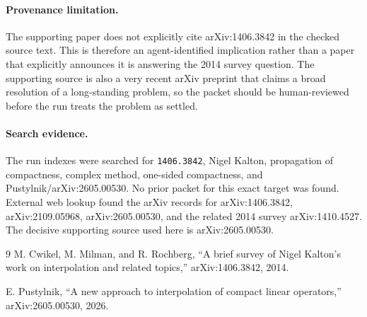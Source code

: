 \documentclass[11pt]{article}
\begin{document}
\paragraph{Provenance limitation.}
The supporting paper does not explicitly cite arXiv:1406.3842 in the checked
source text. This is therefore an agent-identified implication rather than a
paper that explicitly announces it is answering the 2014 survey question. The
supporting source is also a very recent arXiv preprint that claims a broad
resolution of a long-standing problem, so the packet should be human-reviewed
before the run treats the problem as settled.

\paragraph{Search evidence.}
The run indexes were searched for \texttt{1406.3842}, Nigel Kalton,
propagation of compactness, complex method, one-sided compactness, and
Pustylnik/arXiv:2605.00530. No prior packet for this exact target was found.
External web lookup found the arXiv records for arXiv:1406.3842,
arXiv:2109.05968, arXiv:2605.00530, and the related 2014 survey
arXiv:1410.4527. The decisive supporting source used here is arXiv:2605.00530.

\begin{thebibliography}{9}
M. Cwikel, M. Milman, and R. Rochberg,
``A brief survey of Nigel Kalton's work on interpolation and related topics,''
arXiv:1406.3842, 2014.

E. Pustylnik,
``A new approach to interpolation of compact linear operators,''
arXiv:2605.00530, 2026.
\end{thebibliography}
\end{document}

